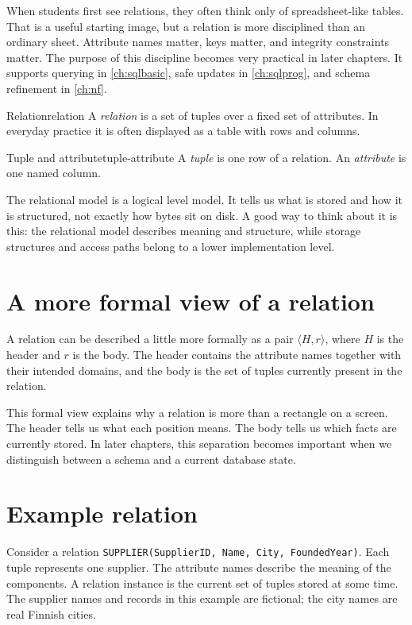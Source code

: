 \documentclass[11pt,a4paper,openany]{book}
\begin{document}
When students first see relations, they often think only of spreadsheet-like tables. That is a useful starting image, but a relation is more disciplined than an ordinary sheet. Attribute names matter, keys matter, and integrity constraints matter. The purpose of this discipline becomes very practical in later chapters. It supports querying in \cref{ch:sqlbasic}, safe updates in \cref{ch:sqlprog}, and schema refinement in \cref{ch:nf}.

\begin{definition}{Relation}{relation}
A \emph{relation} is a set of tuples over a fixed set of attributes. In everyday practice it is often displayed as a table with rows and columns.
\end{definition}

\begin{definition}{Tuple and attribute}{tuple-attribute}
A \emph{tuple} is one row of a relation. An \emph{attribute} is one named column.
\end{definition}

The relational model is a logical level model. It tells us what is stored and how it is structured, not exactly how bytes sit on disk. A good way to think about it is this: the relational model describes meaning and structure, while storage structures and access paths belong to a lower implementation level.

\section{A more formal view of a relation}
A relation can be described a little more formally as a pair \(\langle H,r\rangle\), where \(H\) is the header and \(r\) is the body. The header contains the attribute names together with their intended domains, and the body is the set of tuples currently present in the relation.

This formal view explains why a relation is more than a rectangle on a screen. The header tells us what each position means. The body tells us which facts are currently stored. In later chapters, this separation becomes important when we distinguish between a schema and a current database state.

\section{Example relation}
Consider a relation \texttt{SUPPLIER(SupplierID, Name, City, FoundedYear)}. Each tuple represents one supplier. The attribute names describe the meaning of the components. A relation instance is the current set of tuples stored at some time. The supplier names and records in this example are fictional; the city names are real Finnish cities.
\end{document}
